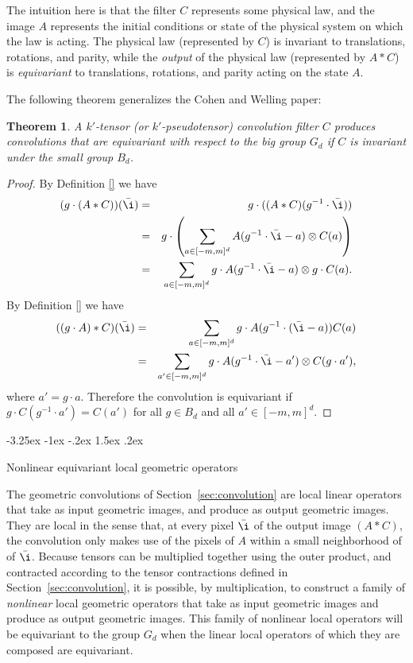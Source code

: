 \documentclass{article}
\makeatletter
\theoremstyle{plain}
\newtheorem{theorem}{Theorem}
\newcommand{\sectionname}{Section}
\newcommand{\secref}[1]{\sectionname~\ref{#1}}
\renewcommand\section{\@startsection {section}{1}{\z@}%
  {-3.25ex \@plus -1ex \@minus -.2ex}%
  {1.5ex \@plus .2ex}%
  {\raggedright\normalfont\large\bfseries}}
\makeatother
\begin{document}
The intuition here is that the filter $C$ represents some physical law, and the image $A$ represents the initial conditions or state of the physical system on which the law is acting.
The physical law (represented by $C$) is invariant to translations, rotations, and parity, while the \emph{output} of the physical law (represented by $A\ast C$) is \emph{equivariant} to translations, rotations, and parity acting on the state $A$.


The following theorem generalizes the Cohen and Welling paper:

\begin{theorem}
A $k'$-tensor (or $k'$-pseudotensor) convolution filter $C$ produces convolutions that are equivariant with respect to the big group $G_d$ if $C$ is invariant under the small group $B_d$.
\end{theorem}

\begin{proof}
By Definition \ref{} we have
\begin{eqnarray}
(g\cdot (A* C) )(\bar \i) &=& g\cdot( (A*C)(g^{-1} \cdot \bar \i)) \\
&=& g \cdot \left (\sum_{a\in [-m,m]^d} A(g^{-1}\cdot \bar \i - a) \otimes C(a)\right)\\
&=& \sum_{a\in [-m,m]^d} g \cdot A(g^{-1} \cdot \bar \i -a ) \otimes g \cdot C(a).
\end{eqnarray}
By Definition \ref{} we have
\begin{eqnarray}
((g\cdot A)* C) (\bar \i) &=& \sum_{a\in [-m,m]^d} g\cdot A(g^{-1} \cdot (\bar \i - a) ) C(a) \\
&=& \sum_{a'\in [-m,m]^d} g \cdot A(g^{-1}\cdot \bar \i -a') \otimes C(g\cdot a'),
\end{eqnarray}
where $a'=g\cdot a$. Therefore the convolution is equivariant if $g\cdot C(g^{-1} \cdot a') = C(a')$ for all $g\in B_d$ and all $a' \in [-m,m]^d$. 
\end{proof}

\section{Nonlinear equivariant local geometric operators}\label{sec:nonlinear}

The geometric convolutions of \secref{sec:convolution} are local linear operators that take as input geometric images, and produce as output geometric images.
They are local in the sense that, at every pixel $\bar\i$ of the output image $(A\ast C)$, the convolution only makes use of the pixels of $A$ within a small neighborhood of of $\bar\i$.
Because tensors can be multiplied together using the outer product, and contracted according to the tensor contractions defined in \secref{sec:convolution}, it is possible, by multiplication, to construct a family of \emph{nonlinear} local geometric operators that take as input geometric images and produce as output geometric images.
This family of nonlinear local operators will be equivariant to the group $G_d$ when the linear local operators of which they are composed are equivariant.
\end{document}
